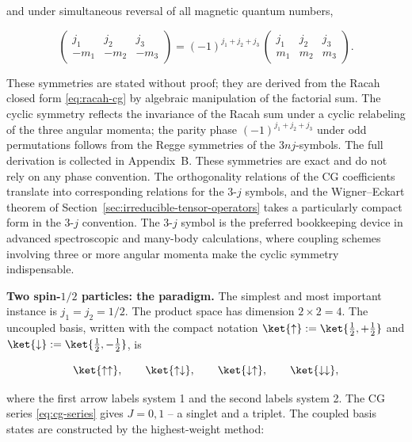 and under simultaneous reversal of all magnetic quantum numbers,
\begin{linenomath}
  \begin{equation*}
    \begin{pmatrix}j_1&j_2&j_3\\ -m_1&-m_2&-m_3\end{pmatrix}
    = (-1)^{j_1+j_2+j_3}\,
      \begin{pmatrix}j_1&j_2&j_3\\ m_1&m_2&m_3\end{pmatrix}.
  \end{equation*}
\end{linenomath}
These symmetries are stated without proof; they are derived from the Racah closed form \eqref{eq:racah-cg} by algebraic manipulation of the factorial sum. The cyclic symmetry reflects the invariance of the Racah sum under a cyclic relabeling of the three angular momenta; the parity phase $(-1)^{j_1+j_2+j_3}$ under odd permutations follows from the Regge symmetries of the $3nj$-symbols. The full derivation is collected in Appendix~B.
These symmetries are exact and do not rely on any phase convention. The orthogonality relations of the CG coefficients translate into corresponding relations for the 3-$j$ symbols, and the Wigner--Eckart theorem of Section~\ref{sec:irreducible-tensor-operators} takes a particularly compact form in the 3-$j$ convention. The 3-$j$ symbol is the preferred bookkeeping device in advanced spectroscopic and many-body calculations, where coupling schemes involving three or more angular momenta make the cyclic symmetry indispensable.

\medskip\noindent\textbf{Two spin-$1/2$ particles: the paradigm.}
The simplest and most important instance is $j_1 = j_2 = 1/2$. The product space has dimension $2 \times 2 = 4$. The uncoupled basis, written with the compact notation $\ket{\uparrow} := \ket{\tfrac12,+\tfrac12}$ and $\ket{\downarrow} := \ket{\tfrac12,-\tfrac12}$, is
\begin{linenomath}
  \begin{equation}
    \ket{\uparrow\uparrow},\qquad
    \ket{\uparrow\downarrow},\qquad
    \ket{\downarrow\uparrow},\qquad
    \ket{\downarrow\downarrow},
  \end{equation}
\end{linenomath}
where the first arrow labels system 1 and the second labels system 2. The CG series \eqref{eq:cg-series} gives $J = 0,1$ -- a singlet and a triplet. The coupled basis states are constructed by the highest-weight method:

